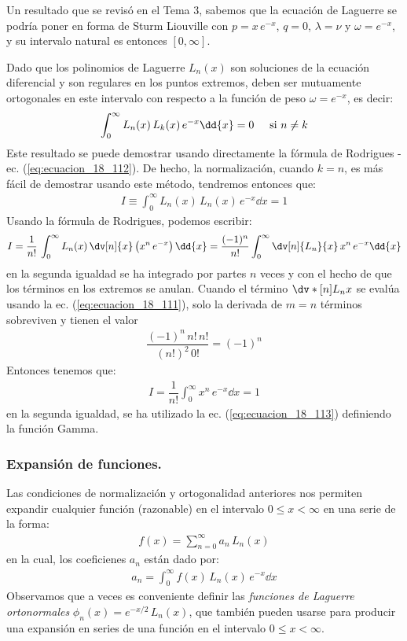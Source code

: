 Un resultado que se revisó en el Tema 3, sabemos que la ecuación de Laguerre se podría poner en forma de Sturm Liouville con $p = x \, e^{-x}$, $q = 0$, $\lambda = \nu$ y $\omega = e^{-x}$, y su intervalo natural es entonces $[0, \infty]$.
\par
Dado que los polinomios de Laguerre $L_{n} (x)$ son soluciones de la ecuación diferencial y son regulares en los puntos extremos, deben ser mutuamente ortogonales en este intervalo con respecto a la función de peso $\omega = e^{-x}$, es decir:
\begin{align*}
\int_{0}^{\infty} L_{n}(x) \, L_{k} (x) \, e^{-x} \dd{x} = 0 \hspace{0.5cm} \text{si } n \neq k
\end{align*}
Este resultado se puede demostrar usando directamente la fórmula de Rodrigues - ec. (\ref{eq:ecuacion_18_112}). De hecho, la normalización, cuando $k = n$, es más fácil de demostrar usando este método, tendremos entonces que:
\begin{align}
I \equiv \int_{0}^{\infty} L_{n} (x) \, L_{n} (x) \, e^{-x} \dd{x} = 1
\label{eq:ecuacion_18_113}
\end{align}
Usando la fórmula de Rodrigues, podemos escribir:
\begin{align*}
I = \dfrac{1}{n!} \, \int_{0}^{\infty} L_{n}(x) \, \dv[n]{x} \left( x^{n} \, e^{-x} \right) \dd{x} = \dfrac{(-1)^{n}}{n!} \int_{0}^{\infty} \dv[n]{L_{n}}{x} \, x^{n} \, e^{-x} \dd{x}
\end{align*}
en la segunda igualdad se ha integrado por partes $n$ veces y con el hecho de que los términos en los extremos se anulan. Cuando el término $\dv*[n]{L_{n}}{x}$ se evalúa usando la ec. (\ref{eq:ecuacion_18_111}), solo la derivada de $m = n$ términos sobreviven y tienen el valor
\begin{align*}
\dfrac{(-1)^{n} \, n! \, n!}{(n!)^{2} \, 0!} = (-1)^{n}
\end{align*}
Entonces tenemos que:
\begin{align*}
I = \dfrac{1}{n!} \int_{0}^{\infty} x^{n} \, e^{-x} \dd{x} = 1
\end{align*}
en la segunda igualdad, se ha utilizado la ec. (\ref{eq:ecuacion_18_113}) definiendo la función Gamma.

\subsubsection{Expansión de funciones.}

Las condiciones de normalización y ortogonalidad anteriores nos permiten expandir cualquier función (razonable) en el intervalo $0 \leq x < \infty$ en una serie de la forma:
\begin{align*}
f(x) = \sum_{n=0}^{\infty} a_{n} \, L_{n} (x)
\end{align*}
en la cual, los coeficienes $a_{n}$ están dado por:
\begin{align*}
a_{n} = \int_{0}^{\infty} f(x) \, L_{n}(x) \, e^{-x} \dd{x}
\end{align*}
Observamos que a veces es conveniente definir las \emph{funciones de Laguerre ortonormales} $\phi_{n} (x) = e^{-x/2} \, L_{n} (x)$, que también pueden usarse para producir una expansión en series de una función en el intervalo $0 \leq x < \infty$.
